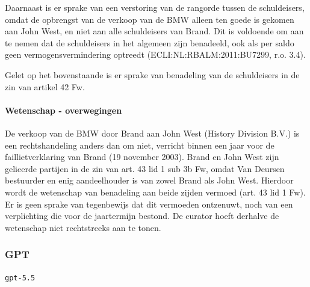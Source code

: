 \documentclass[
  dutch,
  a4paper,
]{article}
\begin{document}
Daarnaast is er sprake van een verstoring van de rangorde tussen de schuldeisers, omdat de opbrengst van de verkoop van de BMW alleen ten goede is gekomen aan John West, en niet aan alle schuldeisers van Brand. Dit is voldoende om aan te nemen dat de schuldeisers in het algemeen zijn benadeeld, ook als per saldo geen vermogensvermindering optreedt (ECLI:NL:RBALM:2011:BU7299, r.o. 3.4).

Gelet op het bovenstaande is er sprake van benadeling van de schuldeisers in de zin van artikel 42 Fw.

\paragraph{Wetenschap - overwegingen}\label{wetenschap---overwegingen-60}

De verkoop van de BMW door Brand aan John West (History Division B.V.) is een rechtshandeling anders dan om niet, verricht binnen een jaar voor de faillietverklaring van Brand (19 november 2003). Brand en John West zijn gelieerde partijen in de zin van art. 43 lid 1 sub 3b Fw, omdat Van Deursen bestuurder en enig aandeelhouder is van zowel Brand als John West. Hierdoor wordt de wetenschap van benadeling aan beide zijden vermoed (art. 43 lid 1 Fw). Er is geen sprake van tegenbewijs dat dit vermoeden ontzenuwt, noch van een verplichting die voor de jaartermijn bestond. De curator hoeft derhalve de wetenschap niet rechtstreeks aan te tonen.

\newpage


\subsubsection{GPT}\label{gpt-20}

\texttt{gpt-5.5}
\end{document}
